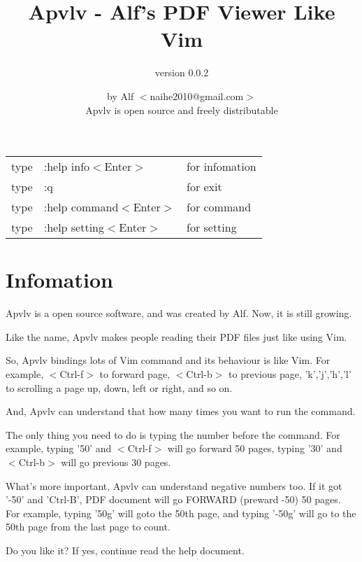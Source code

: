 \documentclass[a4paper,12pt]{article}
\begin{document}
\large

\title{Apvlv - Alf's PDF Viewer Like Vim}
\author{version 0.0.2}
\date{by Alf $<$naihe2010@gmail.com$>$ \\Apvlv is open source and freely distributable}
\maketitle{}

\begin{center}
\begin{tabular}{lll}
type & :help info$<$Enter$>$      & for infomation \\
type & :q                         & for exit \\
type & :help command$<$Enter$>$   & for command \\
type & :help setting$<$Enter$>$   & for setting \\
\end{tabular}
\end{center}

\newpage

\section{Infomation}

Apvlv is a open source software, and was created by Alf. Now, it is still growing.

Like the name, Apvlv makes people reading their PDF files just like using Vim.

So, Apvlv bindings lots of Vim command and its behaviour is like Vim. For example, $<$Ctrl-f$>$ to forward page, $<$Ctrl-b$>$ to previous page, 'k','j','h','l' to scrolling a page up, down, left or right, and so on. 

And, Apvlv can understand that how many times you want to run the command.

The only thing you need to do is typing the number before the command. For example, typing '50' and $<$Ctrl-f$>$ will go forward 50 pages, typing '30' and $<$Ctrl-b$>$ will go previous 30 pages.

What's more important, Apvlv can understand negative numbers too. If it got '-50' and 'Ctrl-B', PDF document will go FORWARD (preward -50) 50 pages. For example, typing '50g' will goto the 50th page, and typing '-50g' will go to the 50th page from the last page to count.

Do you like it? If yes, continue read the help document.
\end{document}

